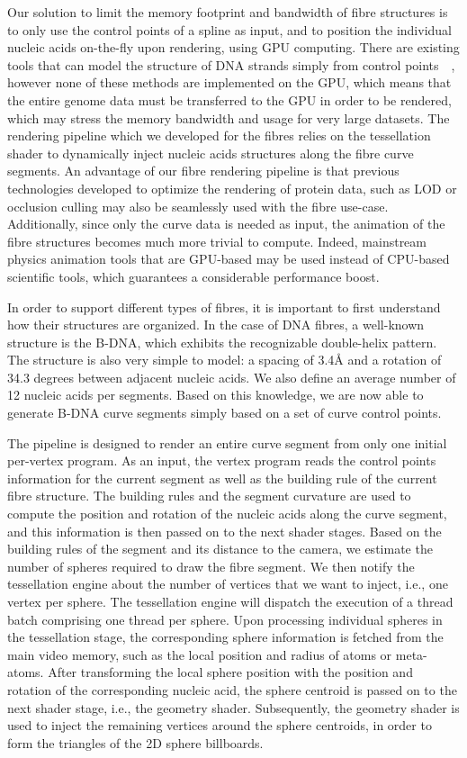Our solution to limit the memory footprint and bandwidth of fibre structures is to only use the control points of a spline as input, and to position the individual nucleic acids on-the-fly upon rendering, using GPU computing.
There are existing tools that can model the structure of DNA strands simply from control points~\cite{lu20083dna}~\cite{hornus2013easy}, however none of these methods are implemented on the GPU, which means that the entire genome data must be transferred to the GPU in order to be rendered, which may stress the memory bandwidth and usage for very large datasets.
The rendering pipeline which we developed for the fibres relies on the tessellation shader to dynamically inject nucleic acids structures along the fibre curve segments.
An advantage of our fibre rendering pipeline is that previous technologies developed to optimize the rendering of protein data, such as LOD or occlusion culling may also be seamlessly used with the fibre use-case.
Additionally, since only the curve data is needed as input, the animation of the fibre structures becomes much more trivial to compute.
Indeed, mainstream physics animation tools that are GPU-based may be used instead of CPU-based scientific tools, which guarantees a considerable performance boost.

In order to support different types of fibres, it is important to first understand how their structures are organized.
In the case of DNA fibres, a well-known structure is the B-DNA, which exhibits the recognizable double-helix pattern.
The structure is also very simple to model: a spacing of 3.4Å and a rotation of 34.3 degrees between adjacent nucleic acids. 
We also define an average number of 12 nucleic acids per segments.
Based on this knowledge, we are now able to generate B-DNA curve segments simply based on a set of curve control points.

The pipeline is designed to render an entire curve segment from only one initial per-vertex program.
As an input, the vertex program reads the control points information for the current segment as well as the building rule of the current fibre structure.
The building rules and the segment curvature are used to compute the position and rotation of the nucleic acids along the curve segment, and this information is then passed on to the next shader stages.
Based on the building rules of the segment and its distance to the camera, we estimate the number of spheres required to draw the fibre segment.
We then notify the tessellation engine about the number of vertices that we want to inject, i.e., one vertex per sphere.
The tessellation engine will dispatch the execution of a thread batch comprising one thread per sphere.
Upon processing individual spheres in the tessellation stage, the corresponding sphere information is fetched from the main video memory, such as the local position and radius of atoms or meta-atoms.
After transforming the local sphere position with the position and rotation of the corresponding nucleic acid, the sphere centroid is passed on to the next shader stage, i.e., the geometry shader.
Subsequently, the geometry shader is used to inject the remaining vertices around the sphere centroids, in order to form the triangles of the 2D sphere billboards.

